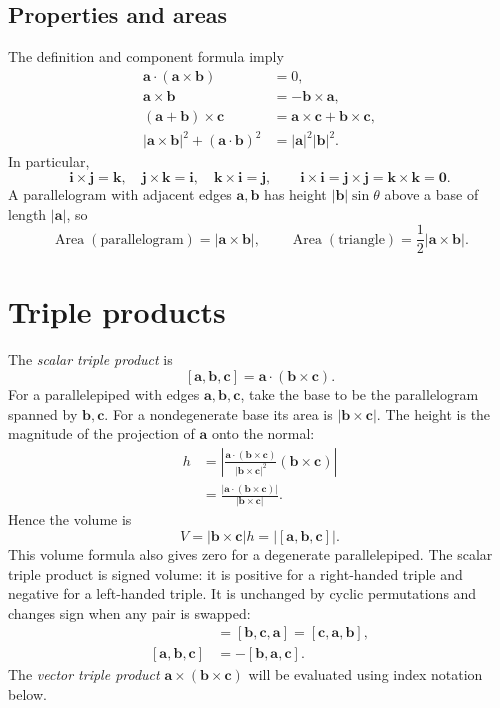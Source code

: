 \subsection{Properties and areas}
The definition and component formula imply
\begin{align*}
 \mathbf a\cdot(\mathbf a\times\mathbf b)&=0,\\
 \mathbf a\times\mathbf b&=-\mathbf b\times\mathbf a,\\
 (\mathbf a+\mathbf b)\times\mathbf c
   &=\mathbf a\times\mathbf c+\mathbf b\times\mathbf c,\\
 |\mathbf a\times\mathbf b|^2+(\mathbf a\cdot\mathbf b)^2
   &=|\mathbf a|^2|\mathbf b|^2.
\end{align*}
In particular,
\[
 \mathbf i\times\mathbf j=\mathbf k,\quad
 \mathbf j\times\mathbf k=\mathbf i,\quad
 \mathbf k\times\mathbf i=\mathbf j,\qquad
 \mathbf i\times\mathbf i=\mathbf j\times\mathbf j=\mathbf k\times\mathbf k=\mathbf0.
\]
A parallelogram with adjacent edges $\mathbf a,\mathbf b$ has height
$|\mathbf b|\sin\theta$ above a base of length $|\mathbf a|$, so
\[
 \operatorname{Area}(\text{parallelogram})=|\mathbf a\times\mathbf b|,
 \qquad
 \operatorname{Area}(\text{triangle})=\frac12|\mathbf a\times\mathbf b|.
\]

\section{Triple products}

The \emph{scalar triple product} is
\[
 [\mathbf a,\mathbf b,\mathbf c]=\mathbf a\cdot(\mathbf b\times\mathbf c).
\]
For a parallelepiped with edges $\mathbf a,\mathbf b,\mathbf c$, take the
base to be the parallelogram spanned by $\mathbf b,\mathbf c$.
For a nondegenerate base its area is $|\mathbf b\times\mathbf c|$.
The height is the magnitude of the projection of $\mathbf a$ onto the normal:
\begin{align*}
 h
 &=\left|\frac{\mathbf a\cdot(\mathbf b\times\mathbf c)}
 {|\mathbf b\times\mathbf c|^2}(\mathbf b\times\mathbf c)\right|\\
 &=\frac{|\mathbf a\cdot(\mathbf b\times\mathbf c)|}{|\mathbf b\times\mathbf c|}.
\end{align*}
Hence the volume is
\[
 V=|\mathbf b\times\mathbf c|h
 =\boxed{|[\mathbf a,\mathbf b,\mathbf c]|}.
\]
This volume formula also gives zero for a degenerate parallelepiped.
The scalar triple product is signed volume: it is positive for a right-handed
triple and negative for a left-handed triple. It is unchanged by cyclic
permutations and changes sign when any pair is swapped:
\begin{align*}
 [\mathbf a,\mathbf b,\mathbf c]
 &=[\mathbf b,\mathbf c,\mathbf a]=[\mathbf c,\mathbf a,\mathbf b],\\
 [\mathbf a,\mathbf b,\mathbf c]&=-[\mathbf b,\mathbf a,\mathbf c].
\end{align*}
The \emph{vector triple product} $\mathbf a\times(\mathbf b\times\mathbf c)$
will be evaluated using index notation below.

